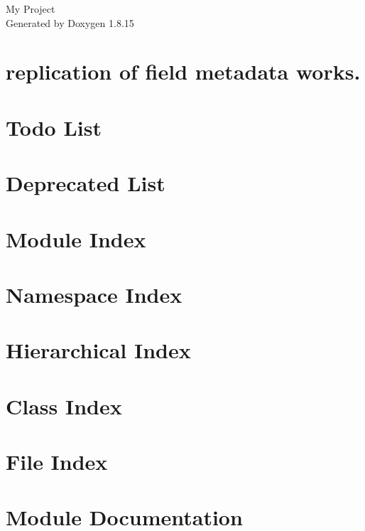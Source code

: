 \documentclass[twoside]{book}
\newcommand{\+}{\discretionary{\mbox{\scriptsize$\hookleftarrow$}}{}{}}
\newcommand{\clearemptydoublepage}{%
  \newpage{\pagestyle{empty}\cleardoublepage}%
}
\begin{document}
\hypersetup{pageanchor=false,
             bookmarksnumbered=true,
             pdfencoding=unicode
            }
\begin{titlepage}
\vspace*{7cm}
\begin{center}%
{\Large My Project }\\
\vspace*{1cm}
{\large Generated by Doxygen 1.8.15}\\
\end{center}
\end{titlepage}
\clearemptydoublepage
{}
\tableofcontents
\clearemptydoublepage
{}
\hypersetup{pageanchor=true}

\chapter{replication of field metadata works.}
\label{How}

\chapter{Todo List}
\label{todo}

\chapter{Deprecated List}
\label{deprecated}

\chapter{Module Index}

\chapter{Namespace Index}

\chapter{Hierarchical Index}

\chapter{Class Index}

\chapter{File Index}

\chapter{Module Documentation}















\end{document}
